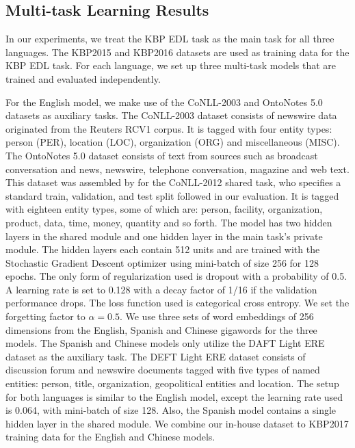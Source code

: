 \documentclass[11pt]{article}
\begin{document}
\subsection{Multi-task Learning Results}

In our experiments, we treat the KBP EDL task as the main task for all three languages. The KBP2015 and KBP2016 datasets are used as training data for the KBP EDL task. For each language, we set up three multi-task models that are trained and evaluated independently. 

For the English model, we make use of the CoNLL-2003 and OntoNotes 5.0 datasets as auxiliary tasks. The CoNLL-2003 dataset \cite{TjongKimSang:2003:ICS:1119176.1119195} consists of newswire data originated from the Reuters RCV1 corpus. It is tagged with four entity types: person (PER), location (LOC), organization (ORG) and miscellaneous (MISC). The OntoNotes 5.0 dataset consists of text from sources such as broadcast conversation and news, newswire, telephone conversation, magazine and web text. This dataset was assembled by \cite{pradhan-etal:2013:conll-2013} for the CoNLL-2012 shared task, who specifies a standard train, validation, and test split followed in our evaluation. It is tagged with eighteen entity types, some of which are: person, facility, organization, product, data, time, money, quantity and so forth. The model has two hidden layers in the shared module and one hidden layer in the main task’s private module. The hidden layers each contain 512 units and are trained with the Stochastic Gradient Descent optimizer using mini-batch of size 256 for 128 epochs. The only form of regularization used is dropout \cite{Srivastava:2014:DSW:2627435.2670313} with a probability of 0.5. A learning rate is set to 0.128 with a decay factor of 1/16 if the validation performance drops. The loss function used is categorical cross entropy. We set the forgetting factor to $\alpha = 0.5$. We use three sets of word embeddings of 256 dimensions from the English, Spanish and Chinese gigawords for the three models. 
The Spanish and Chinese models only utilize the DAFT Light ERE dataset as the auxiliary task. The DEFT Light ERE dataset consists of discussion forum and newswire documents tagged with five types of named entities: person, title, organization, geopolitical entities and location. The setup for both languages is similar to the English model, except the learning rate used is 0.064, with mini-batch of size 128. Also, the Spanish model contains a single hidden layer in the shared module. 
We combine our in-house dataset to KBP2017 training data for the English and Chinese models. 
\end{document}
